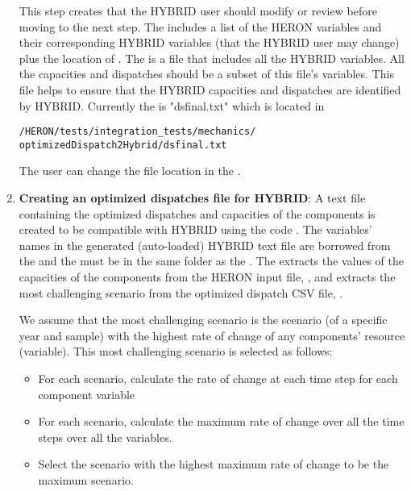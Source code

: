 \begin{enumerate}
This step creates  that the HYBRID user should modify or review before moving to the next step. The  includes a list of the HERON variables and their corresponding HYBRID variables (that the HYBRID user may change) plus the location of . The  is a file that includes all the HYBRID variables. All the capacities and dispatches should be a subset of this file's variables. This file helps to ensure that the HYBRID capacities and dispatches are identified by HYBRID. Currently the  is {"dsfinal.txt"} which is located in 
\begin{lstlisting}
/HERON/tests/integration_tests/mechanics/
optimizedDispatch2Hybrid/dsfinal.txt
\end{lstlisting}
The user can change the file location in the .    
  


\item \textbf{Creating an optimized dispatches file for HYBRID}: A text file containing the optimized dispatches and capacities of the components is created to be compatible with HYBRID using the code . The variables' names in the generated (auto-loaded) HYBRID text file are borrowed from the  and the  must be in the same folder as the . 
 The  extracts the values of the capacities of the components from the HERON input file, , and extracts the most challenging scenario from the optimized dispatch CSV file, . 
 
 We assume that the most challenging scenario is the scenario (of a specific year and sample) with the highest rate of change of any components' resource (variable). This most challenging scenario is selected as follows:
   

\begin{itemize}
 \item For each scenario, calculate the rate of change at each time step for each component variable
  \item For each scenario, calculate the maximum rate of change over all the time steps over all the variables. 
   \item Select the scenario with the highest maximum rate of change to be the maximum scenario.
 \end{itemize}
 



\end{enumerate}
